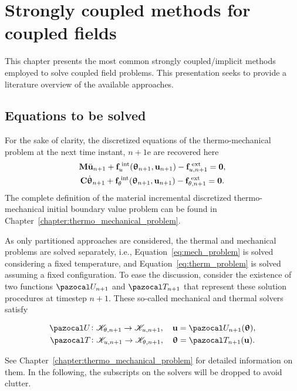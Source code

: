 \chapter {Strongly coupled methods for coupled fields}

This chapter presents the most common strongly coupled/implicit methods employed to solve coupled field problems.
This presentation seeks to provide a literature overview of the available approaches.


\section{Equations to be solved}

For the sake of clarity, the discretized equations of the thermo-mechanical problem at the next time instant, \(n+1\)e are recovered here
\begin{gather}
    \mathbf M \ddot{\mathbf u}_{n+1} +\mathbf f_u^\text{\;int}(\bm \uptheta_{n+1}, \mathbf u_{n+1})-\mathbf f^\text{\;ext}_{u,n+1}=\mathbf 0, \label{eq:mech_problem} \\
    \mathbf C \dot{\bm \uptheta}_{n+1} +\mathbf f_\theta^\text{\;int}(\bm \uptheta_{n+1}, \mathbf u_{n+1})-\mathbf f^\text{\;ext}_{\theta,n+1}=\mathbf 0. \label{eq:therm_problem}
\end{gather}
The complete definition of the material incremental discretized thermo-mechanical initial boundary value problem can be found in Chapter~\ref{chapter:thermo_mechanical_problem}.

As only partitioned approaches are considered, the thermal and mechanical problems are solved separately, i.e., Equation~\eqref{eq:mech_problem} is solved considering a fixed temperature, and Equation~\eqref{eq:therm_problem} is solved assuming a fixed configuration.
To ease the discussion, consider the existence of two functions \(\pazocal U_{n+1}\) and \(\pazocal T_{n+1}\) that represent these solution procedures at timestep \(n+1\).
These so-called mechanical and thermal solvers satisfy
\begin{highlight}[innertopmargin=-5pt]
\begin{gather}
  \pazocal U\colon \mathscr K_{\theta, n+1}\to \mathscr K_{u,n+1},\quad \mathbf u = \pazocal U_{n+1}(\bm \uptheta),\\
  \pazocal T\colon \mathscr K_{u,n+1}\to \mathscr K_{\theta, n+1},\quad \bm \uptheta = \pazocal T_{n+1}(\mathbf u).
\end{gather}
\end{highlight}
See Chapter~\ref{chapter:thermo_mechanical_problem} for detailed information on them.
In the following, the subscripts on the solvers will be dropped to avoid clutter.

